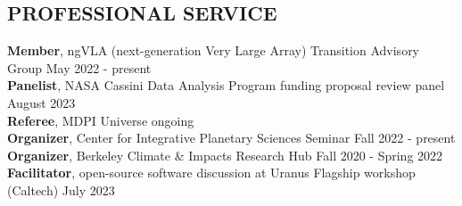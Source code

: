 \documentclass[margin, 10pt]{res} %
\begin{document}
\begin{resume}

\section{PROFESSIONAL SERVICE}

{\bf Member}, ngVLA (next-generation Very Large Array) Transition Advisory Group \hfill May 2022 - present \\
{\bf Panelist}, NASA Cassini Data Analysis Program funding proposal review panel \hfill August 2023 \\
{\bf Referee}, MDPI Universe \hfill ongoing \\
{\bf Organizer}, Center for Integrative Planetary Sciences Seminar \hfill Fall 2022 - present \\
{\bf Organizer}, Berkeley Climate \& Impacts Research Hub \hfill Fall 2020 - Spring 2022 \\
{\bf Facilitator}, open-source software discussion at Uranus Flagship workshop (Caltech) \hfill July 2023 \\









\end{resume}
\end{document}

